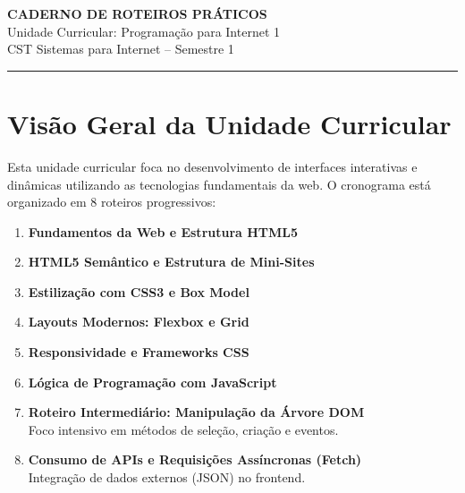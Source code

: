 \documentclass[12pt,a4paper]{article}
\begin{document}
\begin{center}
    {\Large \textbf{CADERNO DE ROTEIROS PRÁTICOS}}\\
    Unidade Curricular: Programação para Internet 1\\
    CST Sistemas para Internet -- Semestre 1
\end{center}

\vspace{0.5cm}
\hrule
\vspace{0.8cm}

\tableofcontents
\newpage

\section{Visão Geral da Unidade Curricular}

Esta unidade curricular foca no desenvolvimento de interfaces interativas e dinâmicas utilizando as tecnologias fundamentais da web. O cronograma está organizado em 8 roteiros progressivos:

\begin{enumerate}
    \item \textbf{Fundamentos da Web e Estrutura HTML5}
    \item \textbf{HTML5 Semântico e Estrutura de Mini-Sites}
    \item \textbf{Estilização com CSS3 e Box Model}
    \item \textbf{Layouts Modernos: Flexbox e Grid}
    \item \textbf{Responsividade e Frameworks CSS}
    \item \textbf{Lógica de Programação com JavaScript}
    \item \textbf{Roteiro Intermediário: Manipulação da Árvore DOM} \\
    Foco intensivo em métodos de seleção, criação e eventos.
    \item \textbf{Consumo de APIs e Requisições Assíncronas (Fetch)} \\
    Integração de dados externos (JSON) no frontend.
\end{enumerate}

\newpage


\end{document}
